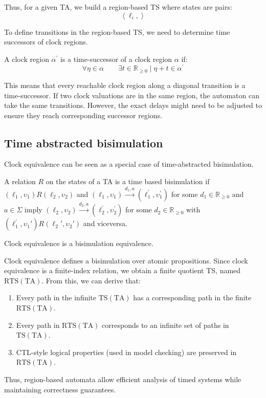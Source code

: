 Thus, for a given TA, we build a region-based TS where states are pairs:
\[\left\langle \ell_i,\right\rangle\]

To define transitions in the region-based TS, we need to determine time successors of clock regions.
\begin{definition}
    A clock region $\alpha^\prime$ is a time-successor of a clock region $\alpha$ if:
    \[\forall\eta\in\alpha\qquad \exists t\in\mathbb{R}_{\geq 0}\mid \eta+t\in\alpha^\prime\]
\end{definition}
\noindent This means that every reachable clock region along a diagonal transition is a time-successor.
If two clock valuations are in the same region, the automaton can take the same transitions.
However, the exact delays might need to be adjusted to ensure they reach corresponding successor regions.

\subsection{Time abstracted bisimulation}
Clock equivalence can be seen as a special case of time-abstracted bisimulation.
\begin{definition}
    A relation $R$ on the states of a TA is a time based bisimulation if $(\ell_1,\upsilon_1)R(\ell_2,\upsilon_2)$ and $(\ell_1,\upsilon_1)\xrightarrow{d_1,a}(\ell_1^\prime,\upsilon_1^\prime)$ for some $d_1 \in\mathbb{R}_{\geq 0}$ and $a\in\Sigma$ imply $(\ell_2,\upsilon_2)\xrightarrow{d_2,a}(\ell_2^\prime,\upsilon_2^\prime)$ for some $d_2 \in\mathbb{R}_{\geq 0}$ with $(\ell_1^\prime,\upsilon_1\prime)R(\ell_2\prime,\upsilon_2\prime)$ and viceversa. 
\end{definition}
\begin{theorem}
    Clock equivalence is a bisimulation equivalence.
\end{theorem}
\noindent Clock equivalence defines a bisimulation over atomic propositions. 
Since clock equivalence is a finite-index relation, we obtain a finite quotient TS, named $\text{RTS}(\text{TA})$.
\noindent From this, we can derive that: 
\begin{enumerate}
    \item Every path in the infinite $\text{TS}(\text{TA})$ has a corresponding path in the finite $\text{RTS}(\text{TA})$.
    \item Every path in $\text{RTS}(\text{TA})$ corresponds to an infinite set of paths in $\text{TS}(\text{TA})$.
    \item CTL-style logical properties (used in model checking) are preserved in $\text{RTS}(\text{TA})$.
\end{enumerate}
\noindent Thus, region-based automata allow efficient analysis of timed systems while maintaining correctness guarantees.